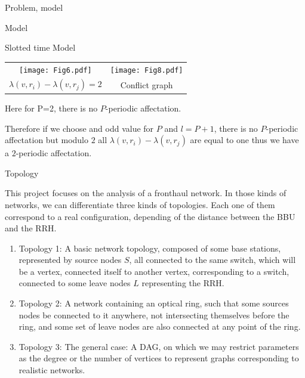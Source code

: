 \documentclass[a4paper,10pt]{report}
\begin{document}
\begin{chapter}{Problem, model}
\begin{section}{Model}
\begin{subsection}{Slotted time Model}
{{\begin{tabular}{cc}
\texttt{[image: Fig6.pdf]} & \texttt{[image: Fig8.pdf]}\\
 $\lambda(v,r_i) - \lambda(v,r_j)=2$ & Conflict graph\\
\end{tabular}\newline
\begin{center}
 Here for P=2, there is no $P$-periodic affectation.
\end{center}

Therefore if we choose and odd value for $P$ and $l=P+1$, there is no $P$-periodic affectation but modulo $2$ all $\lambda(v,r_i) - \lambda(v,r_j)$
are equal to one thus we have a $2$-periodic affectation. 
}}
\end{subsection}
\begin{subsection}{Topology}

This project focuses on the analysis of a fronthaul network. In those kinds of networks, we can differentiate three kinds of
topologies. Each one of them correspond to a real configuration, depending of the distance between the BBU and the RRH.
\begin{enumerate}
 \item Topology 1: A basic network topology, composed of some base stations, represented by source nodes $S$, all connected to the same switch,
which will be a vertex, connected itself to another vertex, corresponding to a switch, connected to some leave nodes $L$ representing the RRH.
\item Topology 2: A network containing an optical ring, such that some sources nodes be connected to it anywhere, not intersecting themselves before the ring,
and some set of leave nodes are also connected at any point of the ring.
\item Topology 3: The general case: A DAG, on which we may restrict parameters as the degree or the number of vertices to represent graphs corresponding to realistic networks.
\end{enumerate}
\fbox{\parbox{12cm}{
\begin{figure}[H]

\begin{center}
 

\end{center}
\end{figure}}}
\end{subsection}
\end{section}
\end{chapter}
\end{document}
